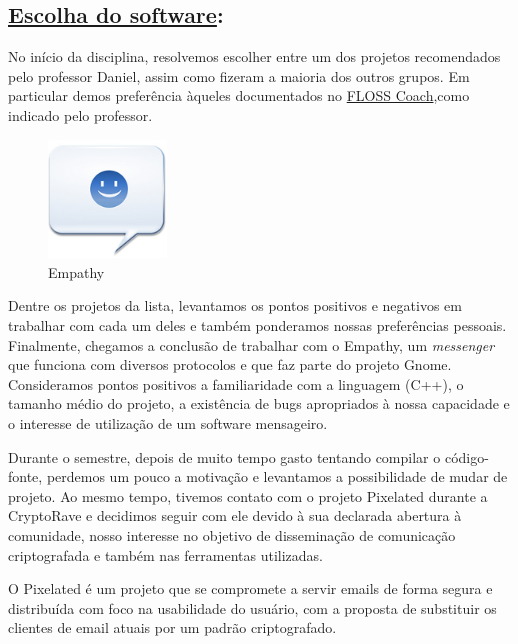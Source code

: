 \subsection*{\underline{Escolha do software}:}

No início da disciplina, resolvemos escolher entre um dos projetos
recomendados pelo professor Daniel, assim como fizeram a maioria dos outros
grupos. Em particular demos preferência àqueles documentados no
\href{http://flosscoach.com}{FLOSS Coach},como indicado pelo professor.

\begin{figure} %
\begin{center}
\includegraphics[width=0.28\textwidth]{src/empathy_logo.jpg}
\caption*{Empathy}
\end{center}
\end{figure}

Dentre os projetos da lista, levantamos os pontos positivos e negativos
em trabalhar com cada um deles e também ponderamos nossas preferências
pessoais. Finalmente, chegamos a conclusão de trabalhar com o Empathy, um
\emph{messenger} que funciona com diversos protocolos e que faz parte do projeto
Gnome. Consideramos pontos positivos a familiaridade com a linguagem (C++), o
tamanho médio do projeto, a existência de bugs apropriados à nossa capacidade e
o interesse de utilização de um software mensageiro.

Durante o semestre, depois
de muito tempo gasto tentando compilar o código-fonte, perdemos um pouco a
motivação e levantamos a possibilidade de mudar de projeto.
Ao mesmo tempo, tivemos
contato com o projeto Pixelated durante a CryptoRave e decidimos seguir com ele
devido à sua declarada abertura à comunidade, nosso interesse no objetivo de
disseminação de comunicação criptografada e também nas ferramentas utilizadas.

O Pixelated é um projeto que se compromete a servir emails de forma segura e
distribuída com foco na usabilidade do usuário, com a
proposta de substituir os clientes de email atuais por um padrão criptografado.